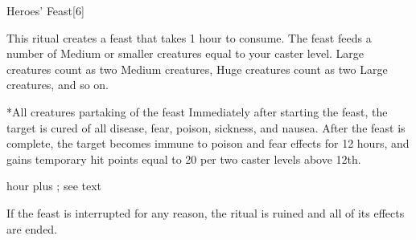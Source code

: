 \begin{spellsection}{Heroes' Feast}[6]
    \begin{spellheader}
    \end{spellheader}
    \begin{spellcontent}
        \begin{spelltargetinginfo}
        \end{spelltargetinginfo}
        \begin{spelleffects}

            \spellline
            \spelleffect This ritual creates a feast that takes 1 hour to consume. The feast feeds a number of Medium or smaller creatures equal to your caster level. Large creatures count as two Medium creatures, Huge creatures count as two Large creatures, and so on.
            \begin{spelltargets}*{All creatures partaking of the feast}
                Immediately after starting the feast, the target is cured of all disease, fear, poison, sickness, and nausea. After the feast is complete, the target becomes immune to poison and fear effects for 12 hours, and gains temporary hit points equal to 20  per two caster levels above 12th.
            \end{spelltargets}

             hour plus \durext; see text
        \end{spelleffects}
    \end{spellcontent}
    \begin{spellfooter}
        \spellnotes If the feast is interrupted for any reason, the ritual is ruined and all of its effects are ended.
    \end{spellfooter}
\end{spellsection}

